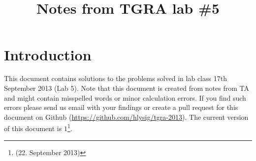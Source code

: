\documentclass[12pt]{article}
\title{\textbf{Notes from TGRA lab \#5}}
\author{}
\date{}
\begin{document}
\maketitle

\section*{Introduction}
This document contains solutions to the problems solved in lab class 17th September 2013 (Lab 5).
Note that this document is created from notes from TA and might contain misspelled words or minor
calculation errors. If you find such errors please send us email with your findings or create a pull
request for this document on Github (\url{https://github.com/hlysig/tgra-2013}). The current
version of this document is $1$\footnote{(22. September 2013)}.




\end{document}
